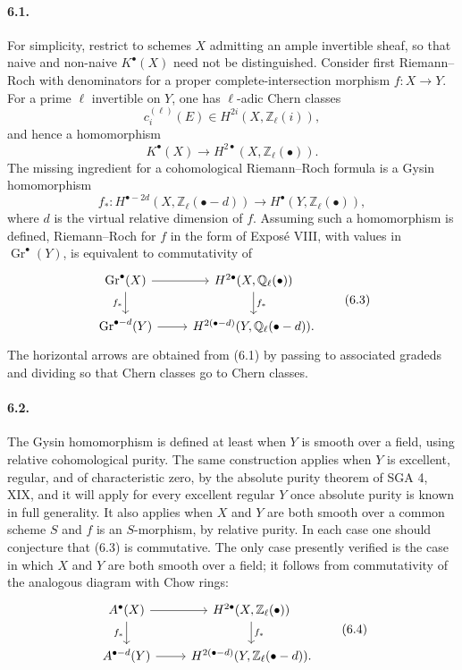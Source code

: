 \documentclass[11pt]{article}
\theoremstyle{plain}
\theoremstyle{definition}
\theoremstyle{remark}
\newcommand{\QQ}{\mathbb Q}
\newcommand{\ZZ}{\mathbb Z}
\DeclareMathOperator{\Gr}{Gr}
\newcommand{\longto}{\longrightarrow}
\begin{document}
\paragraph{6.1.}
For simplicity, restrict to schemes $X$ admitting an ample invertible sheaf, so that naive and non-naive $K^\bullet(X)$ need not be distinguished. Consider first Riemann--Roch with denominators for a proper complete-intersection morphism $f:X\to Y$. For a prime $\ell$ invertible on $Y$, one has $\ell$-adic Chern classes
\[
c_i^{(\ell)}(E)\in H^{2i}(X,\ZZ_\ell(i)),
\]
and hence a homomorphism
\[
K^\bullet(X)\longto H^{2\bullet}(X,\ZZ_\ell(\bullet)).
\tag{6.1}
\]
The missing ingredient for a cohomological Riemann--Roch formula is a Gysin homomorphism
\[
f_*:H^{\bullet-2d}(X,\ZZ_\ell(\bullet-d))
\longto H^\bullet(Y,\ZZ_\ell(\bullet)),
\tag{6.2}
\]
where $d$ is the virtual relative dimension of $f$. Assuming such a homomorphism is defined, Riemann--Roch for $f$ in the form of Exposé VIII, with values in $\Gr^\bullet(Y)$, is equivalent to commutativity of
\[
\begin{tikzcd}
\Gr^\bullet(X)\arrow[r]\arrow[d,"f_*"']&
H^{2\bullet}(X,\QQ_\ell(\bullet))\arrow[d,"f_*"]\\
\Gr^{\bullet-d}(Y)\arrow[r]&
H^{2(\bullet-d)}(Y,\QQ_\ell(\bullet-d)).
\end{tikzcd}
\tag{6.3}
\]
The horizontal arrows are obtained from (6.1) by passing to associated gradeds and dividing so that Chern classes go to Chern classes.

\paragraph{6.2.}
The Gysin homomorphism is defined at least when $Y$ is smooth over a field, using relative cohomological purity. The same construction applies when $Y$ is excellent, regular, and of characteristic zero, by the absolute purity theorem of SGA 4, XIX, and it will apply for every excellent regular $Y$ once absolute purity is known in full generality. It also applies when $X$ and $Y$ are both smooth over a common scheme $S$ and $f$ is an $S$-morphism, by relative purity. In each case one should conjecture that (6.3) is commutative. The only case presently verified is the case in which $X$ and $Y$ are both smooth over a field; it follows from commutativity of the analogous diagram with Chow rings:
\[
\begin{tikzcd}
A^\bullet(X)\arrow[r]\arrow[d,"f_*"']&
H^{2\bullet}(X,\ZZ_\ell(\bullet))\arrow[d,"f_*"]\\
A^{\bullet-d}(Y)\arrow[r]&
H^{2(\bullet-d)}(Y,\ZZ_\ell(\bullet-d)).
\end{tikzcd}
\tag{6.4}
\]
\end{document}
